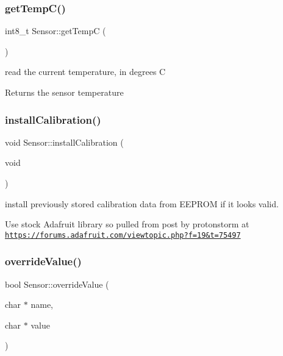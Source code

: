 \subsubsection{\texorpdfstring{get\+Temp\+C()}{getTempC()}}
{\footnotesize\ttfamily int8\+\_\+t Sensor\+::get\+TempC (\begin{DoxyParamCaption}{ }\end{DoxyParamCaption})}



read the current temperature, in degrees C 

\begin{DoxyReturn}{Returns}
the sensor temperature 
\end{DoxyReturn}
\mbox{\label{class_sensor_ac9a8e83f50e6051a14dae3eef24bdba2}} 
\subsubsection{\texorpdfstring{install\+Calibration()}{installCalibration()}}
{\footnotesize\ttfamily void Sensor\+::install\+Calibration (\begin{DoxyParamCaption}\item[{void}]{ }\end{DoxyParamCaption})}



install previously stored calibration data from E\+E\+P\+R\+OM if it looks valid. 

Use stock Adafruit library so pulled from post by protonstorm at \href{https://forums.adafruit.com/viewtopic.php?f=19&t=75497}{\tt https\+://forums.\+adafruit.\+com/viewtopic.\+php?f=19\&t=75497} \mbox{\label{class_sensor_af8ed43603baf0c0b6fb264241b6ee91f}} 
\subsubsection{\texorpdfstring{override\+Value()}{overrideValue()}}
{\footnotesize\ttfamily bool Sensor\+::override\+Value (\begin{DoxyParamCaption}\item[{char $\ast$}]{name,  }\item[{char $\ast$}]{value }\end{DoxyParamCaption})}



